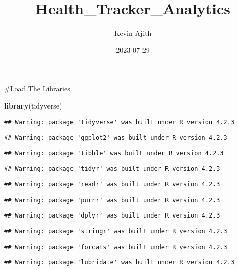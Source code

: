 \documentclass[
]{article}
\title{Health\_Tracker\_Analytics}
\author{Kevin Ajith}
\date{2023-07-29}
\newenvironment{Shaded}{\begin{snugshade}}{\end{snugshade}}
\newcommand{\FunctionTok}[1]{\textcolor[rgb]{0.13,0.29,0.53}{\textbf{#1}}}
\newcommand{\NormalTok}[1]{#1}
\begin{document}
\maketitle

\#Load The Libraries

\begin{Shaded}
\begin{Highlighting}[]
\FunctionTok{library}\NormalTok{(tidyverse)}
\end{Highlighting}
\end{Shaded}

\begin{verbatim}
## Warning: package 'tidyverse' was built under R version 4.2.3
\end{verbatim}

\begin{verbatim}
## Warning: package 'ggplot2' was built under R version 4.2.3
\end{verbatim}

\begin{verbatim}
## Warning: package 'tibble' was built under R version 4.2.3
\end{verbatim}

\begin{verbatim}
## Warning: package 'tidyr' was built under R version 4.2.3
\end{verbatim}

\begin{verbatim}
## Warning: package 'readr' was built under R version 4.2.3
\end{verbatim}

\begin{verbatim}
## Warning: package 'purrr' was built under R version 4.2.3
\end{verbatim}

\begin{verbatim}
## Warning: package 'dplyr' was built under R version 4.2.3
\end{verbatim}

\begin{verbatim}
## Warning: package 'stringr' was built under R version 4.2.3
\end{verbatim}

\begin{verbatim}
## Warning: package 'forcats' was built under R version 4.2.3
\end{verbatim}

\begin{verbatim}
## Warning: package 'lubridate' was built under R version 4.2.3
\end{verbatim}
\end{document}
